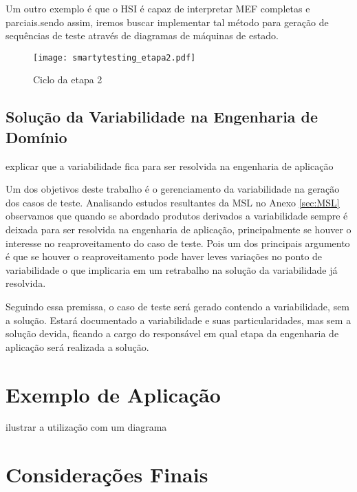 Um outro exemplo é que o HSI é capaz de interpretar MEF completas e parciais.sendo assim, iremos buscar implementar tal método para geração de sequências de teste através de diagramas de máquinas de estado.

\begin{figure}[htb]
	\centering
	\texttt{[image: smartytesting\_etapa2.pdf]}
	\caption{Ciclo da etapa 2}
	\label{fig:SM_etapa2}
\end{figure}


\subsection{Solução da Variabilidade na Engenharia de Domínio}

explicar que a variabilidade fica para ser resolvida na engenharia de aplicação

Um dos objetivos deste trabalho é o gerenciamento da variabilidade na geração dos casos de teste. Analisando estudos resultantes da MSL no Anexo \ref{sec:MSL} observamos que quando se abordado produtos derivados a variabilidade sempre é deixada para ser resolvida na engenharia de aplicação, principalmente se houver o interesse no reaproveitamento do caso de teste. Pois um dos principais argumento é que se houver o reaproveitamento pode haver leves variações no ponto de variabilidade o que implicaria em um retrabalho na solução da variabilidade já resolvida.

Seguindo essa premissa, o caso de teste será gerado contendo a variabilidade, sem a solução. Estará documentado a variabilidade e suas particularidades, mas sem a solução devida, ficando a cargo do responsável em qual etapa da engenharia de aplicação será realizada a solução. 


\section{Exemplo de Aplicação}
\label{exemplo_aplicao_smarty}

ilustrar a utilização com um diagrama

\section{Considerações Finais}
\label{consideracoes_smarty}
